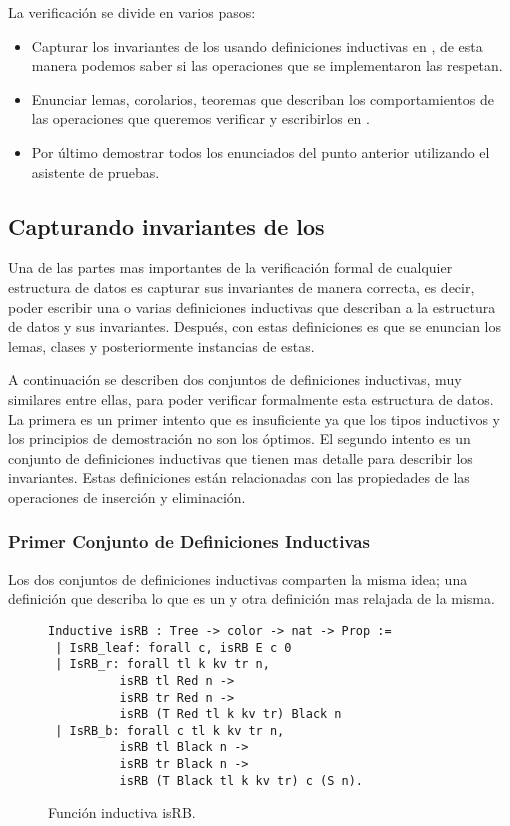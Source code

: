 La verificaci\'on se divide en varios pasos:
\begin{itemize}
    \item Capturar los invariantes de los {\arns} usando definiciones inductivas en {\coq}, de
    esta manera podemos saber si las operaciones que se implementaron las respetan.
    \item Enunciar lemas, corolarios, teoremas que describan los comportamientos de las
    operaciones que queremos verificar y escribirlos en {\coq}.
    \item Por \'ultimo demostrar todos los enunciados del punto anterior utilizando el asistente
    de pruebas.
\end{itemize}{}

\subsection{Capturando invariantes de los {\Arns}}
Una de las partes mas importantes de la verificaci\'on formal de cualquier estructura de datos es
capturar sus invariantes de manera correcta, es decir, poder escribir una o varias definiciones
inductivas que describan a la estructura de datos y sus invariantes. Después, con estas
definiciones es que se enuncian los lemas, clases y posteriormente instancias de estas.

A continuaci\'on se describen dos conjuntos de definiciones inductivas, muy similares entre ellas,
para poder verificar formalmente esta estructura de datos. La primera es un primer intento que es
insuficiente ya que los tipos inductivos y los principios de demostraci\'on no son los \'optimos.
El segundo intento es un conjunto de definiciones inductivas que tienen mas detalle para describir
los invariantes. Estas definiciones est\'an relacionadas con las propiedades de las operaciones de
inserci\'on y eliminaci\'on.

\subsubsection{Primer Conjunto de Definiciones Inductivas}
Los dos conjuntos de definiciones inductivas comparten la misma idea; una definici\'on que
describa lo que es un {\arn} y otra definici\'on mas relajada de la misma.

\begin{figure}
\centering
\captionsetup{justification=centering}
\begin{verbatim}
Inductive isRB : Tree -> color -> nat -> Prop :=
 | IsRB_leaf: forall c, isRB E c 0
 | IsRB_r: forall tl k kv tr n,
          isRB tl Red n ->
          isRB tr Red n ->
          isRB (T Red tl k kv tr) Black n
 | IsRB_b: forall c tl k kv tr n,
          isRB tl Black n ->
          isRB tr Black n ->
          isRB (T Black tl k kv tr) c (S n).
\end{verbatim}
\caption{Funci\'on inductiva isRB.}
\label{inductive_isRB}
\end{figure}

